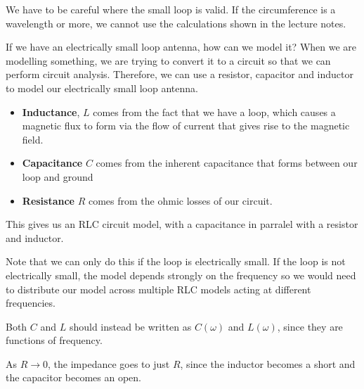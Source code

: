 \documentclass{article}
\begin{document}
We have to be careful where the small loop is valid. If the circumference is a wavelength or more, we cannot use the calculations shown in the lecture notes. 

If we have an electrically small loop antenna, how can we model it? When we are modelling something, we are trying to convert it to a circuit so that we can perform circuit analysis. Therefore, we can use a resistor, capacitor and inductor to model our electrically small loop antenna.

\begin{itemize}
    \item \textbf{Inductance}, $L$ comes from the fact that we have a loop, which causes a magnetic flux to form via the flow of current that gives rise to the magnetic field.
    \item \textbf{Capacitance} $C$ comes from the inherent capacitance that forms between our loop and ground
    \item \textbf{Resistance} $R$ comes from the ohmic losses of our circuit.
\end{itemize}

This gives us an RLC circuit model, with a capacitance in parralel with a resistor and inductor.

Note that we can only do this if the loop is electrically small. If the loop is not electrically small, the model depends strongly on the frequency so we would need to distribute our model across multiple RLC models acting at different frequencies.

Both $C$ and $L$ should instead be written as $C(\omega)$ and $L(\omega)$, since they are functions of frequency.

As $R \to 0$, the impedance goes to just $R$, since the inductor becomes a short and the capacitor becomes an open.
\end{document}
